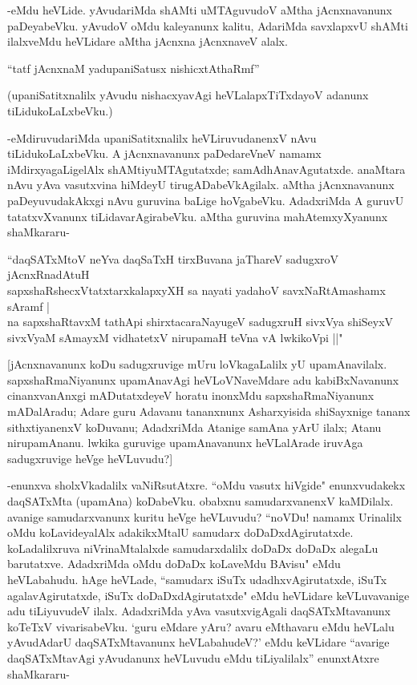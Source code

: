 -eMdu heVLide. yAvudariMda shAMti uMTAguvudoV aMtha jAcnxnavanunx paDeyabeVku. yAvudoV oMdu kaleyanunx kalitu, AdariMda savxlapxvU shAMti ilalxveMdu heVLidare aMtha jAcnxna jAcnxnaveV alalx. 

\begin{shloka}
``tatf jAcnxnaM yadupaniSatusx nishicxtAthaRmf''
\end{shloka}

(upaniSatitxnalilx yAvudu nishacxyavAgi heVLalapxTiTxdayoV adanunx tiLidukoLaLxbeVku.)

-eMdiruvudariMda upaniSatitxnalilx heVLiruvudanenxV nAvu tiLidukoLaLxbeVku. A jAcnxnavanunx paDedareVneV namamx iMdirxyagaLigelAlx shAMtiyuMTAgutatxde; samAdhAnavAgutatxde. anaMtara nAvu yAva vasutxvina hiMdeyU tirugADabeVkAgilalx. aMtha jAcnxnavanunx paDeyuvudakAkxgi nAvu guruvina baLige hoVgabeVku. AdadxriMda A guruvU tatatxvXvanunx tiLidavarAgirabeVku. aMtha guruvina mahAtemxyXyanunx shaMkararu-

\begin{shloka}
``daqSATxMtoV neYva daqSaTxH tirxBuvana jaThareV sadugxroV jAcnxRnadAtuH\\
sapxshaRshecxVtatxtarxkalapxyXH sa nayati yadahoV savxNaRtAmashamx sAramf |\\
na sapxshaRtavxM tathApi shirxtacaraNayugeV sadugxruH sivxVya shiSeyxV\\
sivxVyaM sAmayxM vidhatetxV nirupamaH teVna vA lwkikoV\s pi ||" 
\end{shloka}

[jAcnxnavanunx koDu sadugxruvige mUru loVkagaLalilx yU upamAnavilalx. sapxshaRmaNiyanunx upamAnavAgi heVLoVNaveMdare adu kabiBxNavanunx cinanxvanAnxgi mADutatxdeyeV horatu inonxMdu sapxshaRmaNiyanunx mADalAradu; Adare guru Adavanu tananxnunx Asharxyisida shiSayxnige tananx sithxtiyanenxV koDuvanu; AdadxriMda Atanige samAna yArU ilalx; Atanu nirupamAnanu. lwkika guruvige upamAnavanunx heVLalArade iruvAga sadugxruvige heVge heVLuvudu?]

-enunxva sholxVkadalilx vaNiRsutAtxre. ``oMdu vasutx hiVgide" enunxvudakekx daqSATxMta (upamAna) koDabeVku. obabxnu samudarxvanenxV kaMDilalx. avanige samudarxvanunx kuritu heVge heVLuvudu? ``noVDu! namamx Urinalilx oMdu koLavideyalAlx adakikxMtalU samudarx doDaDxdAgirutatxde. koLadalilxruva niVrinaMtalalxde samudarxdalilx doDaDx doDaDx alegaLu barutatxve. AdadxriMda oMdu doDaDx koLaveMdu BAvisu" eMdu heVLabahudu. hAge heVLade, ``samudarx iSuTx udadhxvAgirutatxde, iSuTx agalavAgirutatxde, iSuTx doDaDxdAgirutatxde" eMdu heVLidare keVLuvavanige adu tiLiyuvudeV ilalx. AdadxriMda yAva vasutxvigAgali daqSATxMtavanunx koTeTxV vivarisabeVku. `guru eMdare yAru? avaru eMthavaru eMdu heVLalu yAvudAdarU daqSATxMtavanunx heVLabahudeV?' eMdu keVLidare ``avarige daqSATxMtavAgi yAvudanunx heVLuvudu eMdu tiLiyalilalx'' enunxtAtxre shaMkararu-


